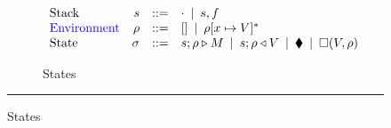 \documentclass[../plutus-core-specification.tex]{subfiles}
\begin{document}
\begin{figure}[!ht]
\begin{subfigure}[c]{\linewidth}        %
{
\[
\begin{array}{lrcl}
        \textrm{Stack} & s      & ::= & \cdot \enspace | \enspace s,f    \\
 \textcolor{blue}{       \textrm{Environment}} & \rho & ::= & [] \enspace | \enspace \rho[x \mapsto V]^* \\
        \textrm{State} & \sigma & ::= & s;\rho \triangleright M \enspace | \enspace s;\rho \triangleleft V  \enspace | \enspace \blacklozenge{} \enspace | \enspace \square (V,\rho)
    \end{array}
\]
}
\caption{States}
\end{subfigure}

\vspace{1mm}
\hrule
\vspace{2mm}


\end{figure}
\end{document}
